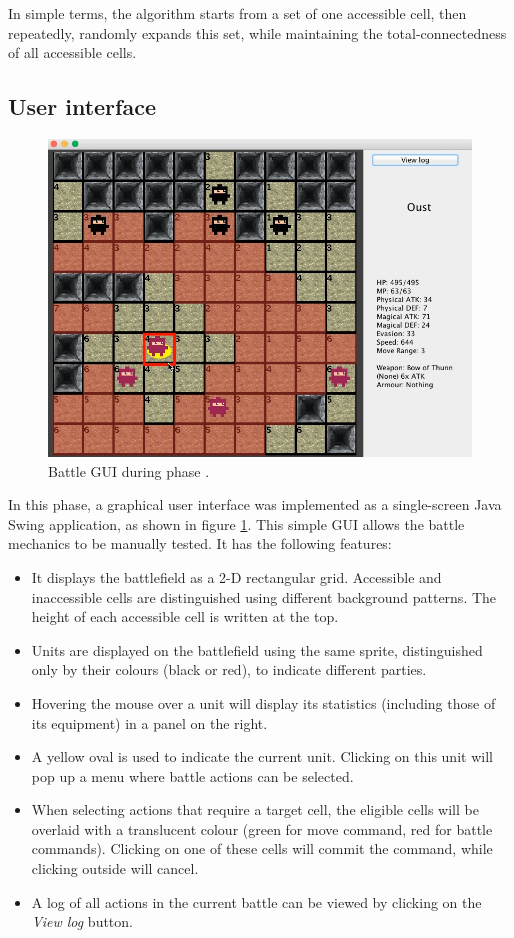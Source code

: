In simple terms, the algorithm starts from a set of one accessible cell, then repeatedly, randomly expands this set, while maintaining the total-connectedness of all accessible cells.

\subsection{User interface}

\begin{figure}
	\centering
	\includegraphics[width=.8\linewidth]{figures/battle1}
	\caption{Battle GUI during phase .}
	\label{fig:guiphase1}
\end{figure}

In this phase, a graphical user interface was implemented as a single-screen Java Swing application, as shown in figure \ref{fig:guiphase1}. This simple GUI allows the battle mechanics to be manually tested. It has the following features:
\begin{itemize}
	\item It displays the battlefield as a 2-D rectangular grid. Accessible and inaccessible cells are distinguished using different background patterns. The height of each accessible cell is written at the top.
	\item Units are displayed on the battlefield using the same sprite, distinguished only by their colours (black or red), to indicate different parties.
	\item Hovering the mouse over a unit will display its statistics (including those of its equipment) in a panel on the right.
	\item A yellow oval is used to indicate the current unit. Clicking on this unit will pop up a menu where battle actions can be selected.
	\item When selecting actions that require a target cell, the eligible cells will be overlaid with a translucent colour (green for move command, red for battle commands). Clicking on one of these cells will commit the command, while clicking outside will cancel.
	\item A log of all actions in the current battle can be viewed by clicking on the \textit{View log} button.
\end{itemize}

